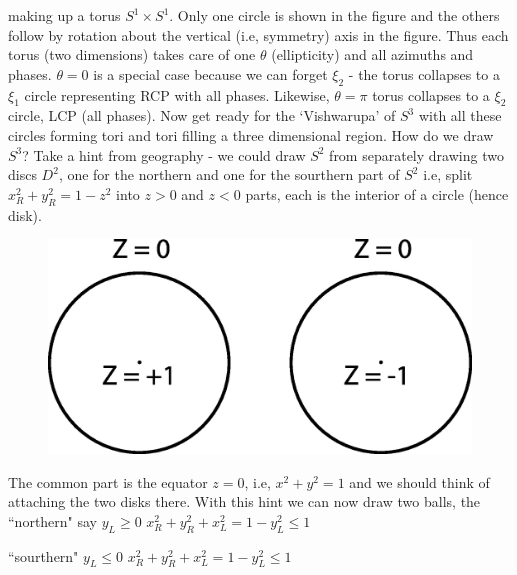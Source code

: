 making up a torus $S^1 \times S^1$. Only one circle is shown in the figure and the others
follow by rotation about the vertical (i.e, symmetry) axis in the figure. Thus
each torus (two dimensions) takes care of one $\theta$ (ellipticity) and all azimuths
and phases. $\theta = 0$ is a special case because we can forget $\xi_2$ - the torus collapses
to a $\xi_1$ circle representing RCP with all phases. Likewise, $\theta = \pi$ torus collapses
to a $\xi_2$ circle, LCP (all phases). Now get ready for the `Vishwarupa' of $S^3$ with
all these circles forming tori and tori filling a three dimensional region. How do
we draw $S^3$? Take a hint from geography - we could draw $S^2$ from separately
drawing two discs $D^2$, one for the northern and one for the sourthern part of
$S^2$ i.e, split $x^2_R + y^2_R = 1 - z^2$ into $z > 0$ and $z < 0$ parts, each is the interior of
a circle (hence disk).

\begin{figure}[H]
\centering
\includegraphics[scale=0.15]{src/images/chap26/14.jpg}
\end{figure}
\bigskip

The common part is the equator $z = 0$, i.e, $x^2 + y^2 = 1$ and we should think
of attaching the two disks there. With this hint we can now draw two balls,
the ~ ``northern" say $y^{\phantom{2}}_{L}  \geq 0$  \quad $x^2_R + y^2_R + x^2_L = 1 - y^2_L \leq 1$
\smallskip

{} \hspace{1.6cm} ``sourthern" $y^{\phantom{2}}_{L} \leq  0$ \quad  $x^2_R + y^2_R + x^2_L = 1 - y^2_L \leq 1$
\bigskip

